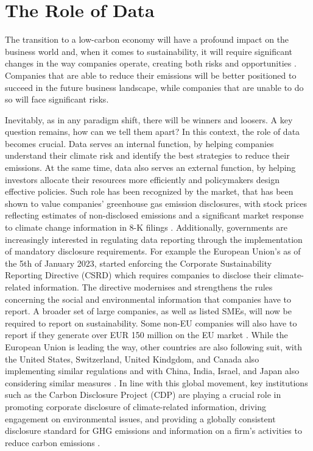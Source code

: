 \section{The Role of Data}
The transition to a low-carbon economy will have a profound impact on the business world and, when it comes to sustainability, it will require significant changes in the way companies operate, creating both risks and opportunities \cite{purpose+profit}. Companies that are able to reduce their emissions will be better positioned to succeed in the future business landscape, while companies that are unable to do so will face significant risks. 

Inevitably, as in any paradigm shift, there will be winners and loosers. A key question remains, how can we tell them apart? In this context, the role of data becomes crucial. Data serves an internal function, by helping companies understand their climate risk and identify the best strategies to reduce their emissions. At the same time, data also serves an external function, by helping investors allocate their resources more efficiently and policymakers design effective policies. Such role has been recognized by the market, that has been shown to value companies' greenhouse gas emission disclosures, with stock prices reflecting estimates of non-disclosed emissions and a significant market response to climate change information in 8-K filings \cite{Griffin}. Additionally, governments are increasingly interested in regulating data reporting through the implementation of mandatory disclosure requirements. For example the European Union's as of the 5th of January 2023, started enforcing the Corporate Sustainability Reporting Directive (CSRD) which requires companies to disclose their climate-related information. The directive modernises and strengthens the rules concerning the social and environmental information that companies have to report. A broader set of large companies, as well as listed SMEs, will now be required to report on sustainability. Some non-EU companies will also have to report if they generate over EUR 150 million on the EU market \cite{EuropeanCommission2023}. While the European Union is leading the way, other countries are also following suit, with the United States, Switzerland, United Kindgdom, and Canada also implementing similar regulations and with China, India, Israel, and Japan also considering similar measures \cite{Jonson2022}. In line with this global movement, key institutions such as the Carbon Disclosure Project (CDP) are  playing a crucial role in promoting corporate disclosure of climate-related information, driving engagement on environmental issues, and providing a globally consistent disclosure standard for GHG emissions and information on a firm’s activities to reduce carbon emissions \cite{CDP2024}. 





